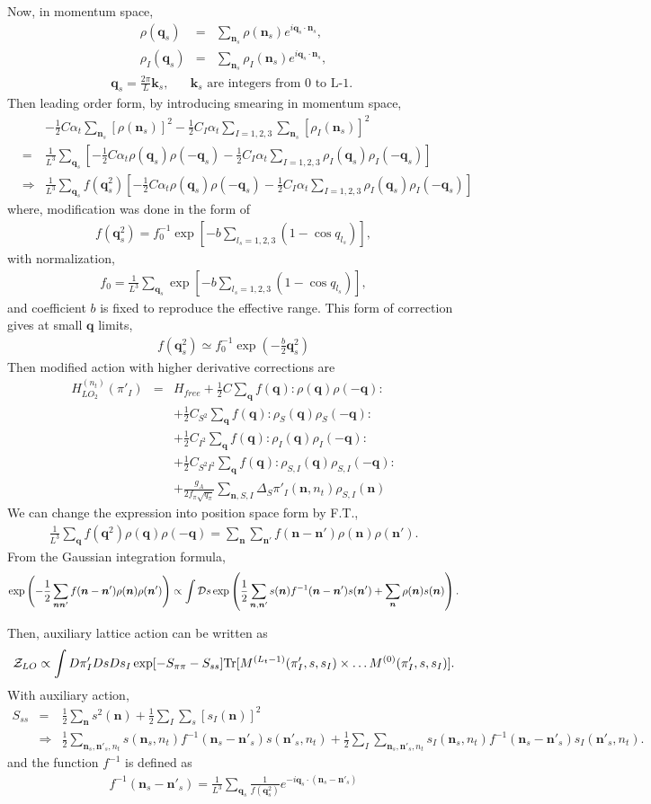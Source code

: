 \documentclass[10pt]{book}
\def\bm{\boldsymbol}
\newcommand{\bea}{\begin{eqnarray}}
\newcommand{\eea}{\end{eqnarray}}
\newcommand{\no}{\nonumber \\}
\def\vk{{\bm k}}
\def\vn{{\bm n}}
\def\vq{{\bm q}}
\begin{document}
Now, in momentum space,
\bea
\rho(\vq_s)&=&\sum_{\vn_s}\rho(\vn_s) e^{i\vq_s\cdot\vn_s},\no 
\rho_I(\vq_s)&=&\sum_{\vn_s} \rho_{I}(\vn_s)e^{i\vq_s\cdot\vn_s},
\eea 
\bea 
\vq_s=\frac{2\pi}{L}\vk_s, \quad \mbox{ $\vk_s$ are integers from 0 to L-1. }
\eea 
Then leading order form, by introducing smearing in momentum space, 
\bea
& &-\frac{1}{2}C\alpha_t\sum_{\vn_s} [\rho(\vn_s)]^2
-\frac{1}{2}C_I\alpha_t\sum_{I=1,2,3}\sum_{\vn_s}[\rho_I(\vn_s)]^2 \no 
&=&\frac{1}{L^3}\sum_{\vq_s}\left[
  -\frac{1}{2}C\alpha_t \rho(\vq_s)\rho(-\vq_s)
  -\frac{1}{2}C_I \alpha_t \sum_{I=1,2,3} \rho_I(\vq_s)\rho_I(-\vq_s)
\right]\no 
&\Rightarrow& \frac{1}{L^3}\sum_{\vq_s}f(\vq_s^2)\left[
  -\frac{1}{2}C\alpha_t \rho(\vq_s)\rho(-\vq_s)
  -\frac{1}{2}C_I \alpha_t \sum_{I=1,2,3} \rho_I(\vq_s)\rho_I(-\vq_s)
\right]
\eea 
where, modification was done in the form of
\bea 
f(\vq_s^2)=f_0^{-1}\exp\left[-b\sum_{l_s=1,2,3}(1-\cos q_{l_s})  \right],
\eea 
with normalization,
\bea 
f_0=\frac{1}{L^3}\sum_{\vq_s}\exp\left[-b\sum_{l_s=1,2,3}(1-\cos q_{l_s})  \right],
\eea 
and coefficient $b$ is fixed to reproduce the effective range. This form
of correction gives at small $\vq$ limits,
\bea 
f(\vq_s^2)\simeq f_0^{-1} \exp\left( -\frac{b}{2}\vq_s^2 \right)
\eea 
Then modified action with higher derivative corrections are
\bea 
H^{(n_t)}_{LO_2}(\pi'_I)&=& H_{free}+\frac{1}{2}C\sum_{\vq} f(\vq) :\rho(\vq)\rho(-\vq):\no 
  & &+\frac{1}{2}C_{S^2}\sum_{\vq} f(\vq) :\rho_S(\vq)\rho_S(-\vq):\no 
  & &+\frac{1}{2}C_{I^2}\sum_{\vq} f(\vq) :\rho_I(\vq)\rho_I(-\vq):\no 
  & &+\frac{1}{2}C_{S^2I^2}\sum_{\vq} f(\vq) :\rho_{S,I}(\vq)\rho_{S,I}(-\vq):\no 
  & &+\frac{g_A}{2f_\pi\sqrt{q_\pi}}\sum_{\vn,S,I}\Delta_S\pi'_I(\vn,n_t)\rho_{S,I}(\vn)
\eea 
We can change the expression into position space form by F.T., 
\bea 
\frac{1}{L^3}\sum_{\vq} f(\vq^2) \rho(\vq)\rho(-\vq)
=\sum_{\vn}\sum_{\vn'} f(\vn-\vn') \rho(\vn)\rho(\vn').
\eea 
From the Gaussian integration formula,
\bea 
\exp\left( -\frac{1}{2} \sum_{\vn\vn'} f(\vn-\vn') \rho(\vn)\rho(\vn')\right) 
\propto \int {\cal D} s
       \exp\left( \frac{1}{2}\sum_{\vn,\vn'} s(\vn)f^{-1}(\vn-\vn') s(\vn')
            +\sum_{\vn} \rho(\vn) s(\vn) \right). 
\eea 

Then, auxiliary lattice action can be written as
\bea 
{\cal Z}_{LO}\propto \int D\pi'_I Ds D s_I \exp[-S_{\pi\pi}-S_{ss}]
   {\rm Tr}[M^{(L_t-1)}(\pi'_I,s,s_I)\times\dots M^{(0)}(\pi'_I,s,s_I)].
\eea 
With auxiliary action,
\bea 
S_{ss}&=&\frac{1}{2}\sum_{\vn}s^2(\vn) +\frac{1}{2}\sum_{I}\sum_{s} [s_I(\vn)]^2 \no 
&\Rightarrow& \frac{1}{2}\sum_{\vn_s,\vn'_s,n_t} s(\vn_s,n_t)f^{-1}(\vn_s-\vn'_s) s(\vn'_s,n_t)
+\frac{1}{2}\sum_{I} \sum_{\vn_s,\vn'_s,n_t} s_I(\vn_s,n_t) f^{-1}(\vn_s-\vn'_s) s_I(\vn'_s,n_t).
\eea 
and the function $f^{-1}$ is defined as
\bea 
f^{-1}(\vn_s-\vn'_s)=\frac{1}{L^3}\sum_{\vq_s}\frac{1}{f(\vq_s^2)}e^{-i\vq_s\cdot(\vn_s-\vn'_s)}
\eea 
\end{document}
